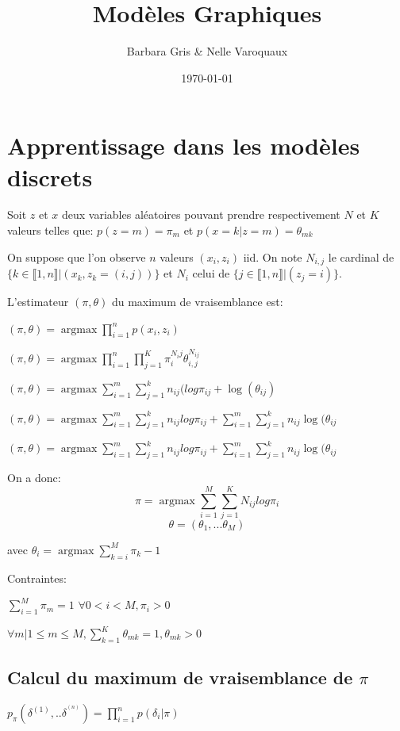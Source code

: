 \documentclass{article}
\date{\today}
\title{Modèles Graphiques}
\author{Barbara Gris \& Nelle Varoquaux}
\DeclareMathOperator{\argmax}{argmax}
\begin{document}
\maketitle
\tableofcontents{}
\vfill \eject


\section{Apprentissage dans les modèles discrets}

Soit $z$ et $x$ deux variables aléatoires pouvant prendre
respectivement $N$ et $K$ valeurs telles que: $p(z= m) =
\pi_m$ et $p(x=k|z=m) = \theta_{mk}$

On suppose que l'on observe $n$ valeurs $(x_i, z_i)$ iid. On note 
$N_{i, j}$ le cardinal de 
$\{k \in \llbracket 1, n \rrbracket | (x_{k}, z_k = (i, j))\}$ et $N_i$ celui
de $\{j \in \llbracket 1, n \rrbracket | (z_j = i )\}$.

L'estimateur $(\pi, \theta)$ du maximum de vraisemblance est:

$(\pi, \theta) = \argmax \prod_{i=1}^n p(x_i, z_i)$

$(\pi, \theta) = \argmax \prod_{i=1}^n \prod_{j=1}^K \pi_i^{N_ij} \theta_{i,j}^{N_{ij}}$

$(\pi, \theta) = \argmax \sum_{i=1}^{m} \sum_{j=1}^k n_{ij}(log\pi_{ij} + \log(\theta_{ij})$

$(\pi, \theta) = \argmax \sum_{i=1}^{m} \sum_{j=1}^k n_{ij}log\pi_{ij} + \sum_{i=1}^{m} \sum_{j=1}^k n_{ij}\log(\theta_{ij}$

$(\pi, \theta) = \argmax \sum_{i=1}^{m} \sum_{j=1}^k n_{ij}log\pi_{ij} + \sum_{i=1}^{m} \sum_{j=1}^k n_{ij}\log(\theta_{ij}$

On a donc:
$$\pi = \argmax \sum_{i=1}^{M} \sum_{j=1}^K N_{ij} log\pi_i$$
$$\theta = (\theta_1, ... \theta_M)$$

avec $\theta_i = \argmax \sum_{k=i}^M \pi_k - 1$


Contraintes:

$\sum_{i = 1}^M \pi_m = 1$
$\forall 0 < i < M, \pi_i > 0$

$\forall m | 1 \leq m \leq M, \sum_{k = 1}^K \theta_{mk} = 1, \theta_{mk}
> 0$

\subsection{Calcul du maximum de vraisemblance de $\pi$}

$p_\pi(\delta^{(1)}, .. \delta^{^(n)}) = \prod_{i=1}^n p (\delta_{i} | \pi)$
\end{document}
